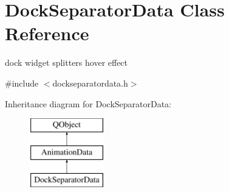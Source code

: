 \hypertarget{class_dock_separator_data}{}\section{Dock\+Separator\+Data Class Reference}
\label{class_dock_separator_data}


dock widget splitters hover effect  




{\ttfamily \#include $<$dockseparatordata.\+h$>$}

Inheritance diagram for Dock\+Separator\+Data\+:\begin{figure}[H]
\begin{center}
\leavevmode
\includegraphics[height=3.000000cm]{class_dock_separator_data}
\end{center}
\end{figure}
